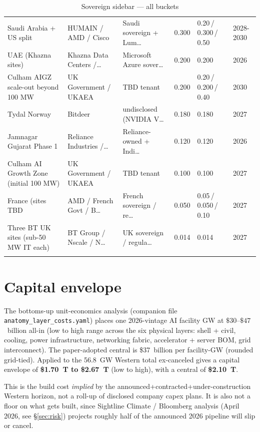 \documentclass[11pt]{article}
\begin{document}
\begin{small}
\begin{longtable}{@{}p{4.5cm} p{2.6cm} p{2.6cm} R{1.3cm} R{2.4cm} l@{}}
Saudi Arabia + US split & HUMAIN / AMD / Cisco & Saudi sovereign + Lum… & 0.300 & 0.20\,/\,0.300\,/\,0.50 & 2028-2030 \\
UAE (Khazna sites) & Khazna Data Centers /… & Microsoft Azure sover… & 0.200 & 0.200 & 2026 \\
Culham AIGZ scale-out beyond 100 MW & UK Government / UKAEA & TBD tenant & 0.200 & 0.20\,/\,0.200\,/\,0.40 & 2030 \\
Tydal Norway & Bitdeer & undisclosed (NVIDIA V… & 0.180 & 0.180 & 2027 \\
Jamnagar Gujarat Phase 1 & Reliance Industries /… & Reliance-owned + Indi… & 0.120 & 0.120 & 2026 \\
Culham AI Growth Zone (initial 100 MW) & UK Government / UKAEA & TBD tenant & 0.100 & 0.100 & 2027 \\
France (sites TBD & AMD / French Govt / B… & French sovereign / re… & 0.050 & 0.05\,/\,0.050\,/\,0.10 & 2027 \\
Three BT UK sites (sub-50 MW IT each) & BT Group / Nscale / N… & UK sovereign / regula… & 0.014 & 0.014 & 2027 \\
\caption{Sovereign sidebar --- all buckets}\label{tab:sov}
\end{longtable}
\end{small}
\section{Capital envelope}\label{sec:capex}
\noindent The bottoms-up unit-economics analysis (companion file \texttt{anatomy\_layer\_costs.yaml}) places one 2026-vintage AI facility GW at $\$30$--$\$47$~billion all-in (low to high range across the six physical layers: shell + civil, cooling, power infrastructure, networking fabric, accelerator + server BOM, grid interconnect). The paper-adopted central is \$37~billion per facility-GW (rounded grid-tied). Applied to the 56.8~GW Western total ex-canceled gives a capital envelope of \textbf{\$1.70~T to \$2.67~T} (low to high), with a central of \textbf{\$2.10~T}.

This is the build cost \emph{implied} by the announced+contracted+under-construction Western horizon, not a roll-up of disclosed company capex plans. It is also not a floor on what gets built, since Sightline Climate / Bloomberg analysis (April 2026, see \S\ref{sec:risk}) projects roughly half of the announced 2026 pipeline will slip or cancel.
\end{document}
